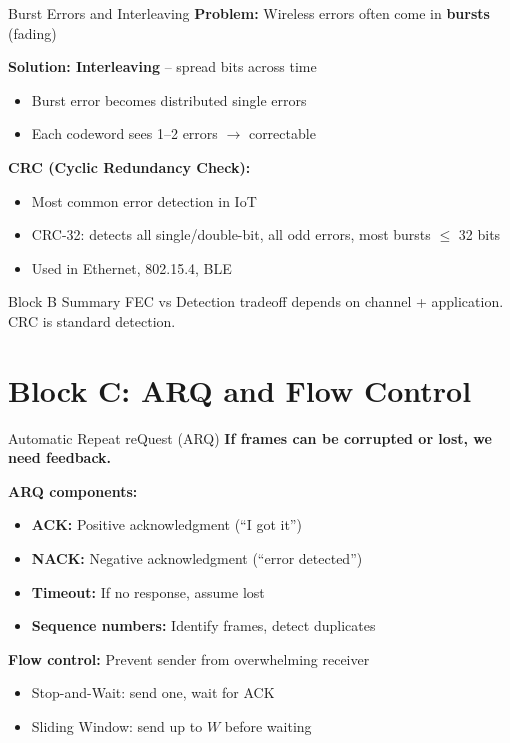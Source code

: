 \documentclass[aspectratio=169,11pt]{beamer}
\begin{document}
\begin{frame}{Burst Errors and Interleaving}
    \textbf{Problem:} Wireless errors often come in \textbf{bursts} (fading)
    
    \textbf{Solution: Interleaving} -- spread bits across time
    \begin{itemize}
        \item Burst error becomes distributed single errors
        \item Each codeword sees 1--2 errors $\rightarrow$ correctable
    \end{itemize}
    
    \vspace{0.3cm}
    \textbf{CRC (Cyclic Redundancy Check):}
    \begin{itemize}
        \item Most common error detection in IoT
        \item CRC-32: detects all single/double-bit, all odd errors, most bursts $\leq$ 32 bits
        \item Used in Ethernet, 802.15.4, BLE
    \end{itemize}
    
    \begin{block}{Block B Summary}
        FEC vs Detection tradeoff depends on channel + application. CRC is standard detection.
    \end{block}
\end{frame}

\section{Block C: ARQ and Flow Control}

\begin{frame}{Automatic Repeat reQuest (ARQ)}
    \textbf{If frames can be corrupted or lost, we need feedback.}
    
    \vspace{0.3cm}
    \textbf{ARQ components:}
    \begin{itemize}
        \item \textbf{ACK:} Positive acknowledgment (``I got it'')
        \item \textbf{NACK:} Negative acknowledgment (``error detected'')
        \item \textbf{Timeout:} If no response, assume lost
        \item \textbf{Sequence numbers:} Identify frames, detect duplicates
    \end{itemize}
    
    \vspace{0.3cm}
    \textbf{Flow control:} Prevent sender from overwhelming receiver
    \begin{itemize}
        \item Stop-and-Wait: send one, wait for ACK
        \item Sliding Window: send up to $W$ before waiting
    \end{itemize}
\end{frame}
\end{document}
